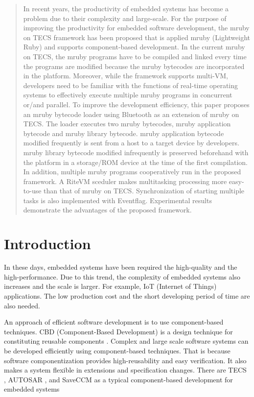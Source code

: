 \documentclass[a4j,12pt,oneside,openany,english]{jsbook}
\begin{document}
\begin{abstract}
In recent years, the productivity of embedded systems has become a problem due to their complexity and large-scale.
For the purpose of improving the productivity for embedded software development, the mruby on TECS framework has been proposed that is applied mruby (Lightweight Ruby) and supports component-based development.
In the current mruby on TECS, the mruby programs have to be compiled and linked every time the programs are modified because the mruby bytecodes are incorporated in the platform.
Moreover, while the framework supports multi-VM, developers need to be familiar with the functions of real-time operating systems to effectively execute multiple mruby programs in concurrent or/and parallel.
To improve the development efficiency, this paper proposes an mruby bytecode loader using Bluetooth as an extension of mruby on TECS.
The loader executes two mruby bytecodes, mruby application bytecode and mruby library bytecode.
mruby application bytecode modified frequently is sent from a host to a target device by developers.
mruby library bytecode modified infrequently is preserved beforehand with the platform in a storage/ROM device at the time of the first compilation.
In addition, multiple mruby programs cooperatively run in the proposed framework.
A RiteVM sceduler makes multitasking processing more easy-to-use than that of mruby on TECS.
Synchronization of starting multiple tasks is also implemented with Eventflag. 
Experimental results demonstrate the advantages of the proposed framework.
\end{abstract}
\clearpage
\tableofcontents
\clearpage
\setcounter{page}{0}
\chapter{Introduction}
In these days, embedded systems have been required the high-quality and the high-performance.
Due to this trend, the complexity of embedded systems also increases and the scale is larger.
For example, IoT (Internet of Things) applications.
The low production cost and the short developing period of time are also needed.

An approach of efficient software development is to use component-based techniques.
CBD (Component-Based Development) is a design technique for constituting reusable components \cite{par:Crnkovic}.
Complex and large scale software systems can be developed efficiently using component-based techniques.
That is because software componentization provides high-reusability and easy verification.
It also makes a system flexible in extensions and specification changes.
There are TECS \cite{par:TECS}, AUTOSAR \cite{url:AUTOSAR}, and SaveCCM \cite{par:SAVEapproach} as a typical component-based development for embedded systems 
\end{document}
